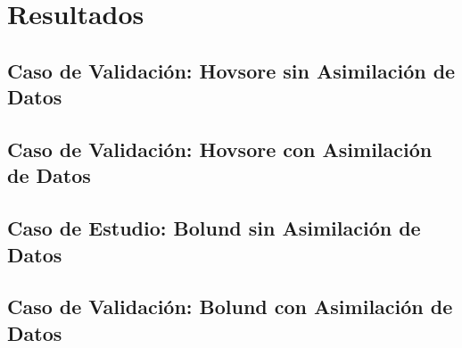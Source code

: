 \chapter{Resultados}
\section{Caso de Validación: Hovsore sin Asimilación de Datos}

\section{Caso de Validación: Hovsore con Asimilación de Datos}

\section{Caso de Estudio: Bolund sin Asimilación de Datos}

\section{Caso de Validación: Bolund con Asimilación de Datos}